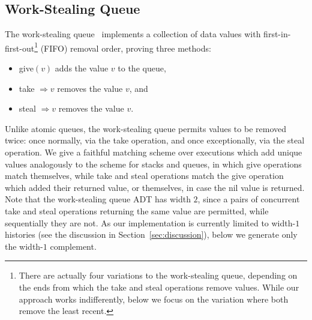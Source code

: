 \subsection{Work-Stealing Queue}

The work-stealing queue~\cite{journals/dc/HendlerLMS06} implements a collection
of data values with first-in-first-out\footnote{There are actually four
variations to the work-stealing queue, depending on the ends from which the
take and steal operations remove values. While our approach works
indifferently, below we focus on the variation where both remove the least
recent.} (FIFO) removal order, proving three methods:
\begin{itemize}

  \item give$(v)$ adds the value $v$ to the queue,

  \item take $\Rightarrow v$ removes the value $v$, and

  \item steal $\Rightarrow v$ removes the value $v$.

\end{itemize}
Unlike atomic queues, the work-stealing queue permits values to be removed
twice: once normally, via the take operation, and once exceptionally, via the
steal operation. We give a faithful matching scheme over executions which add
unique values analogously to the scheme for stacks and queues, in which give
operations match themselves, while take and steal operations match the give
operation which added their returned value, or themselves, in case the nil
value is returned. Note that the work-stealing queue ADT has width $2$,
since a pairs of concurrent take and steal operations returning the same value
are permitted, while sequentially they are not. As our implementation is
currently limited to width-$1$ histories (see the discussion in
Section~\ref{sec:discussion}), below we generate only the width-$1$ complement.

